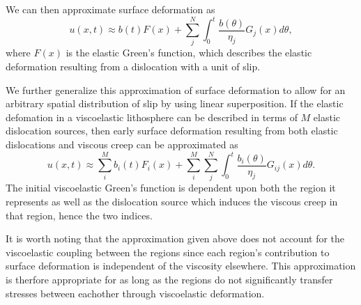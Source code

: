 \documentclass[fleqn,12pt]{article}
\begin{document}
We can then approximate surface deformation as
\begin{equation}
  u(x,t) \approx b(t)F(x) + \sum_j^N\int_0^t \frac{b(\theta)}{\eta_j}G_j(x) d\theta,
\end{equation}
where $F(x)$ is the elastic Green's function, which describes the
elastic deformation resulting from a dislocation with a unit of slip.

We further generalize this approximation of surface deformation to
allow for an arbitrary spatial distribution of slip by using linear
superposition.  If the elastic defomation in a viscoelastic
lithosphere can be described in terms of $M$ elastic dislocation
sources, then early surface deformation resulting from both elastic
dislocations and viscous creep can be approximated as
\begin{equation}\label{Postseismic_Approximation}
u(x,t) \approx \sum_i^Mb_i(t)F_i(x) + 
               \sum_i^M\sum_j^N\int_0^t\frac{b_i(\theta)}{\eta_j}G_{ij}(x) d\theta.
\end{equation}
The initial viscoelastic Green's function is dependent upon both the
region it represents as well as the dislocation source which induces
the viscous creep in that region, hence the two indices.  

It is worth noting that the approximation given above does not account
for the viscoelastic coupling between the regions since each region's
contribution to surface deformation is independent of the viscosity
elsewhere.  This approximation is therfore appropriate for as long as
the regions do not significantly transfer stresses between eachother
through viscoelastic deformation.
\end{document}
